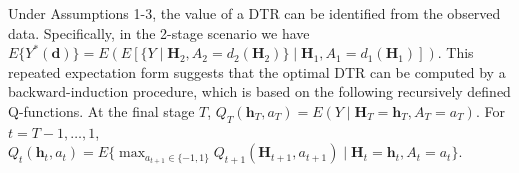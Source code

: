 \documentclass[12pt]{article}
\begin{document}
Under Assumptions 1-3, the value of a DTR can be identified from the observed data. Specifically, in the 2-stage scenario we have $E\{Y^*(\bm{d})\} = E(E[\{Y\mid \bm{H}_2,A_2 = d_2(\bm{H}_2)\}\mid \bm{H}_1,A_1 = d_1(\bm{H}_1)] )$.
This repeated expectation form suggests that the optimal DTR can be computed by a backward-induction procedure, which is based on the following recursively defined Q-functions. %
At the final stage $T$, $Q_T\left(\bm{h}_T, a_T\right) = E\left(Y \mid \bm{H}_T=\bm{h}_T, A_T=a_T\right)$. For $ t=T-1,\ldots,1$, $Q_t\left(\bm{h}_t, a_t\right) = E\{\max_{a_{t+1} \in \{-1,1\}} Q_{t+1}(\bm{H}_{t+1}, a_{t+1}) \mid \bm{H}_t=\bm{h}_t, A_t=a_t\}.$
\end{document}
